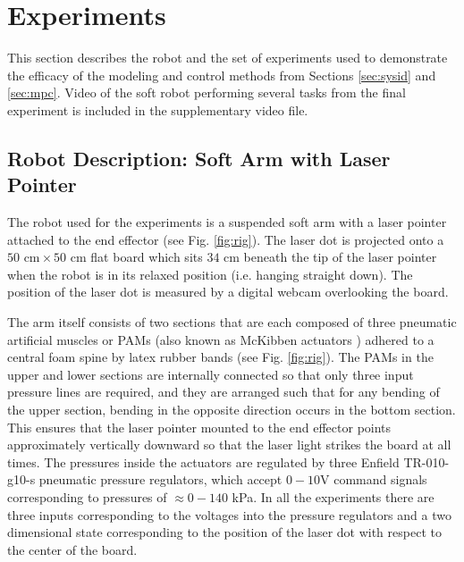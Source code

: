 \section{Experiments}
\label{sec:experiments}

This section describes the robot and the set of experiments used to demonstrate the efficacy of the modeling and control methods from Sections \ref{sec:sysid} and \ref{sec:mpc}.
Video of the soft robot performing several tasks from the final experiment is included in the supplementary video file.

\subsection{Robot Description: Soft Arm with Laser Pointer}
\label{sec:robot}

The robot used for the experiments is a suspended soft arm with a laser pointer attached to the end effector (see Fig. \ref{fig:rig}). 
The laser dot is projected onto a ${50\text{ cm} \times 50\text{ cm}}$ flat board which sits $34\text{ cm}$ beneath the tip of the laser pointer when the robot is in its relaxed position (i.e. hanging straight down).
The position of the laser dot is measured by a digital webcam overlooking the board.

The arm itself consists of two sections that are each composed of three pneumatic artificial muscles or PAMs (also known as McKibben actuators \cite{tondu2012modelling}) adhered to a central foam spine by latex rubber bands (see Fig. \ref{fig:rig}).
The PAMs in the upper and lower sections are internally connected so that only three input pressure lines are required, and
they are arranged such that for any bending of the upper section, bending in the opposite direction occurs in the bottom section.
This ensures that the laser pointer mounted to the end effector points approximately vertically downward so that the laser light strikes the board at all times.
The pressures inside the actuators are regulated by three Enfield TR-010-g10-s pneumatic pressure regulators, which accept ${0-10}$V command signals corresponding to pressures of ${ \approx 0 - 140 }$ kPa.
In all the experiments there are three inputs corresponding to the voltages into the pressure regulators and a two dimensional state corresponding to the position of the laser dot with respect to the center of the board.

